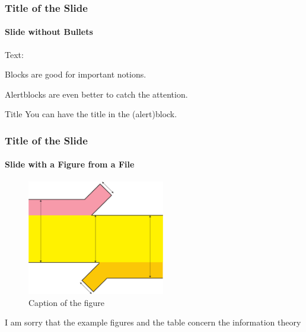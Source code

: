 \begin{frame}
	\frametitle{Title of the Slide}
		\framesubtitle{Slide without Bullets}

	Text:

	\vfill

	\begin{block}{}
		Blocks are good for important notions.
	\end{block}

	\vfill

	\begin{alertblock}{}
		Alertblocks are even better to catch the attention.
	\end{alertblock}

	\vfill

	\begin{alertblock}{Title}
		You can have the title in the (alert)block.
	\end{alertblock}

\end{frame}

\begin{frame}
	\frametitle{Title of the Slide}
		\framesubtitle{Slide with a Figure from a File}

	\begin{figure}
		\includegraphics[width=6cm]{./figures/TIiK_channel_mutual_new}
		\caption{Caption of the figure}
	\end{figure}

	\vspace{-0.5cm}

	\tiny I am sorry that the example figures and the table concern the information theory \smiley

\end{frame}

